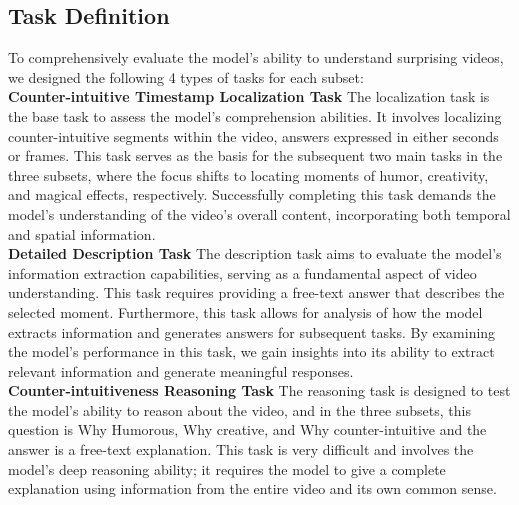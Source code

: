 


\subsection{Task Definition}


To comprehensively evaluate the model's ability to understand surprising videos, we designed the following 4 types of tasks for each subset: \\
\noindent\textbf{Counter-intuitive Timestamp Localization Task}\quad
The localization task is the base task to assess the model's comprehension abilities. It involves localizing counter-intuitive segments within the video, answers expressed in either seconds or frames. This task serves as the basis for the subsequent two main tasks in the three subsets, where the focus shifts to locating moments of humor, creativity, and magical effects, respectively. Successfully completing this task demands the model's understanding of the video's overall content, incorporating both temporal and spatial information.\\
\noindent\textbf{Detailed Description Task}\quad
The description task aims to evaluate the model's information extraction capabilities, serving as a fundamental aspect of video understanding. This task requires providing a free-text answer that describes the selected moment. Furthermore, this task allows for analysis of how the model extracts information and generates answers for subsequent tasks. By examining the model's performance in this task, we gain insights into its ability to extract relevant information and generate meaningful responses.\\
\noindent\textbf{Counter-intuitiveness Reasoning Task}\quad
The reasoning task is designed to test the model's ability to reason about the video, and in the three subsets, this question is Why Humorous, Why creative, and Why counter-intuitive and the answer is a free-text explanation. This task is very difficult and involves the model's deep reasoning ability; it requires the model to give a complete explanation using information from the entire video and its own common sense.\\

